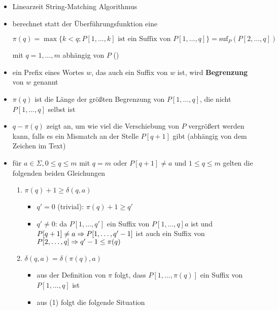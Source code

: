 \vspace*{-0.5\baselineskip}\begin{itemize}[itemsep=-2pt]
	\item Linearzeit String-Matching Algorithmus
	\item berechnet statt der Überführungsfunktion eine \textbf{\bound}
		\begin{center}
		$\pi(q) = \max\{k<q;P[1,\dots,k]\text{ ist ein Suffix von }P[1,\dots,q]\}=\text{suf}_P(P[2,\dots,q])$\end{center}
	mit $q=1,\dots,m$ abhängig von $P$ ()%
	\item ein Prefix eines Wortes $w$, das auch ein Suffix von $w$ ist, wird \textbf{Begrenzung} von $w$ genannt
	\item $\pi(q)$ ist die Länge der größten Begrenzung von $P[1,\dots,q]$, die nicht $P[1,\dots,q]$ selbst ist
	\item $q-\pi(q)$ zeigt an, um wie viel die Verschiebung von $P$ vergrößert werden kann, falls es ein Mismatch an der Stelle $P[q+1]$ gibt (abhängig von dem Zeichen im Text)
	\item für $a\in \Sigma, 0\leq q\leq m$ mit $q=m$ oder $P[q+1]\neq a$ und $1\leq q\leq m$ gelten die folgenden beiden Gleichungen
		\begin{enumerate}
			\item $\pi(q)+1\geq \delta(q,a)$
				\vspace*{-1.5\baselineskip}\Proof\up
					\begin{itemize}
						\item $q'=0$ (trivial): $\pi(q)+1\geq q'$
						\item $q'\neq 0$: da $P[1,\dots,q']$ ein Suffix von $P[1,\dots,q]a$ ist und $P[q+1]\neq a\\
						\Rightarrow P[1,\dots,q'-1]$ ist auch ein Suffix von $P[2,\dots,q]\\
						\Rightarrow q'-1 \leq \pi(q)$
					\end{itemize}
			\item $\delta(q,a)=\delta(\pi(q),a)$
				\vspace*{-1.5\baselineskip}\Proof\up
					\begin{itemize}
						\item aus der Definition von $\pi$ folgt, dass $P[1,\dots,\pi(q)]$ ein Suffix von $P[1,\dots, q]$ ist
						\item aus (1) folgt die folgende Situation\\

\end{itemize}
\end{enumerate}
\end{itemize}
